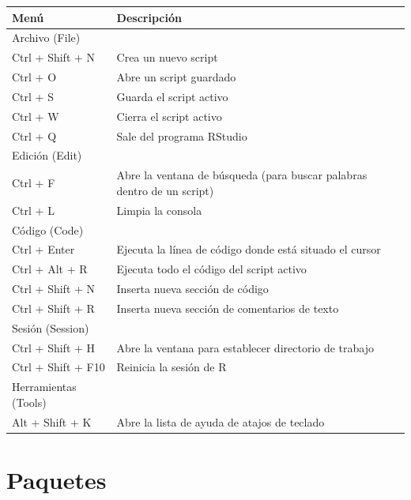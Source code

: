 \documentclass[
  spanish,
  a4paper,
]{scrbook}
\newcounter{none} %
\begin{document}
{\def\LTcaptype{none} %
\begin{longtable}[]{@{}
  >{\raggedright\arraybackslash}p{}
  >{\raggedright\arraybackslash}p{}@{}}
\toprule\noalign{}
\begin{minipage}[b]{\linewidth}\raggedright
Menú
\end{minipage} & \begin{minipage}[b]{\linewidth}\raggedright
Descripción
\end{minipage} \\
\midrule\noalign{}
\endhead
\bottomrule\noalign{}
\endlastfoot
Archivo (File) & \\
Ctrl + Shift + N & Crea un nuevo script \\
Ctrl + O & Abre un script guardado \\
Ctrl + S & Guarda el script activo \\
Ctrl + W & Cierra el script activo \\
Ctrl + Q & Sale del programa RStudio \\
Edición (Edit) & \\
Ctrl + F & Abre la ventana de búsqueda (para buscar palabras dentro de
un script) \\
Ctrl + L & Limpia la consola \\
Código (Code) & \\
Ctrl + Enter & Ejecuta la línea de código donde está situado el
cursor \\
Ctrl + Alt + R & Ejecuta todo el código del script activo \\
Ctrl + Shift + N & Inserta nueva sección de código \\
Ctrl + Shift + R & Inserta nueva sección de comentarios de texto \\
Sesión (Session) & \\
Ctrl + Shift + H & Abre la ventana para establecer directorio de
trabajo \\
Ctrl + Shift + F10 & Reinicia la sesión de R \\
Herramientas (Tools) & \\
Alt + Shift + K & Abre la lista de ayuda de atajos de teclado \\
\end{longtable}
}

\section{Paquetes}\label{paquetes}
\end{document}
